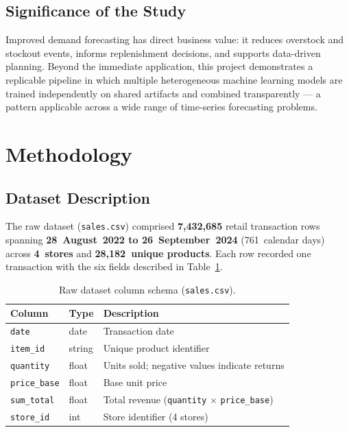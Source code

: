 \documentclass[12pt, a4paper]{article}
\begin{document}
\subsection{Significance of the Study}
\label{subsec:significance}

Improved demand forecasting has direct business value: it reduces overstock and stockout
events, informs replenishment decisions, and supports data-driven planning. Beyond the
immediate application, this project demonstrates a replicable pipeline in which multiple
heterogeneous machine learning models are trained independently on shared artifacts and
combined transparently — a pattern applicable across a wide range of time-series
forecasting problems.

\newpage
\section{Methodology}
\label{sec:methodology}

\subsection{Dataset Description}
\label{subsec:dataset}

The raw dataset (\texttt{sales.csv}) comprised \textbf{7,432,685} retail transaction rows
spanning \textbf{28~August~2022 to 26~September~2024} (761~calendar days) across
\textbf{4~stores} and \textbf{28,182~unique products}. Each row recorded one transaction
with the six fields described in Table~\ref{tab:raw_schema}.

\begin{table}[H]
    \centering
    \caption{Raw dataset column schema (\texttt{sales.csv}).}
    \label{tab:raw_schema}
    \renewcommand{\arraystretch}{1.2}
    \begin{tabular}{@{}llp{7cm}@{}}
        \toprule
        \textbf{Column} & \textbf{Type} & \textbf{Description} \\
        \midrule
        \texttt{date}        & date   & Transaction date \\
        \texttt{item\_id}    & string & Unique product identifier \\
        \texttt{quantity}    & float  & Units sold; negative values indicate returns \\
        \texttt{price\_base} & float  & Base unit price \\
        \texttt{sum\_total}  & float  & Total revenue
                                        (\texttt{quantity} $\times$ \texttt{price\_base}) \\
        \texttt{store\_id}   & int    & Store identifier (4 stores) \\
        \bottomrule
    \end{tabular}
\end{table}
\end{document}
